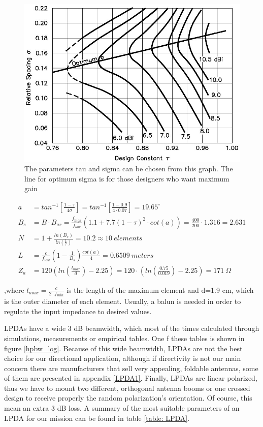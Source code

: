 \begin{figure}[htb]
\centering
\includegraphics[width=1\textwidth]{figures/Yannis/Log_gain}
\caption{The parameters tau and sigma can be chosen from this graph. The line for optimum sigma is for those designers who want maximum gain\cite{balanis,Log}}
\label{log_gain}
\end{figure}

\begin{subequations}
\begin{align}
    a&=tan^{-1}[\frac{1-\tau}{4 \sigma}]=tan^{-1}[\frac{1-0.9}{4 \cdot 0.07}]=19.65^{\circ} \\
    B_{s}&=B \cdot B_{ar}=\frac{f_{high}}{f_{low}} (1.1+7.7(1-\tau)^2 \cdot cot(a))= \frac{400}{200} \cdot 1.316=2.631 \\
    N&=1+\frac{ln(B_{s})}{ln(\frac{1}{\tau})}=10.2 \approx 10 \ elements \\
    L&=\frac{c}{f_{low}} (1-\frac{1}{B_{s}}) \frac{cot(a)}{4}=0.6509 \ meters \\
    Z_{a}&=120(ln(\frac{l_{max}}{d})-2.25)=120 \cdot (ln(\frac{0.75}{0.019})-2.25)=171 \ \Omega
\end{align}
\label{eq: LPDA}
\end{subequations}

,where $l_{max}=\frac{c}{2 \cdot f_{min}}$ is the length of the maximum element and d=1.9 cm, which is the outer diameter of each element. Usually, a balun is needed in order to regulate the input impedance to desired values. 

LPDAs have a wide 3 dB beamwidth, which most of the times calculated through simulations, measurements or empirical tables. One f these tables is shown in figure \ref{hpbw_log}. Because of this wide beamwidth, LPDAs are not the best choice for our directional application, although if directivity is not our main concern there are manufacturers that sell very appealing, foldable antennas, some of them are presented in appendix \ref{LPDA1}. Finally, LPDAs are linear polarized, thus we have to mount two different, orthogonal antenna booms or one crossed design to receive properly the random polarization's orientation. Of course, this mean an extra 3 dB loss. A summary of the most suitable parameters of an LPDA for our mission can be found in table \ref{table: LPDA}.

